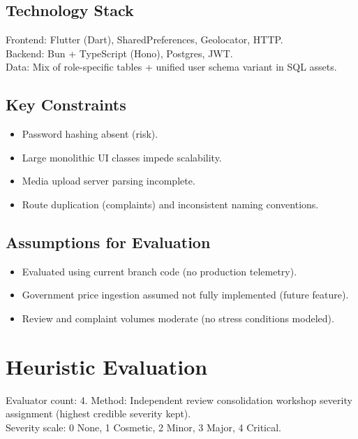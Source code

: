 \documentclass[11pt,a4paper]{article}
\begin{document}
\subsection{Technology Stack}
Frontend: Flutter (Dart), SharedPreferences, Geolocator, HTTP.\\
Backend: Bun + TypeScript (Hono), Postgres, JWT.\\
Data: Mix of role-specific tables + unified user schema variant in SQL assets.

\subsection{Key Constraints}
\begin{itemize}[leftmargin=*]
  \item Password hashing absent (risk).
  \item Large monolithic UI classes impede scalability.
  \item Media upload server parsing incomplete.
  \item Route duplication (complaints) and inconsistent naming conventions.
\end{itemize}

\subsection{Assumptions for Evaluation}
\begin{itemize}[leftmargin=*]
  \item Evaluated using current branch code (no production telemetry).
  \item Government price ingestion assumed not fully implemented (future feature).
  \item Review and complaint volumes moderate (no stress conditions modeled).
\end{itemize}

\section{Heuristic Evaluation}
Evaluator count: 4. Method: Independent review \textrightarrow{} consolidation workshop \textrightarrow{} severity assignment (highest credible severity kept).\\
Severity scale: 0 None, 1 Cosmetic, 2 Minor, 3 Major, 4 Critical.
\end{document}
